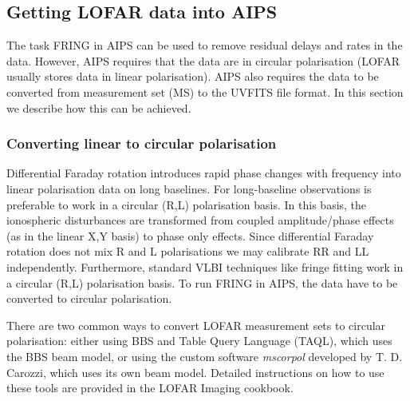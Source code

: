 \documentclass[graybox]{svmult}
\begin{document}


\subsection{Getting LOFAR data into AIPS}
The task FRING in AIPS can be used to remove residual delays and rates in the
data. However, AIPS requires that the data are in circular polarisation (LOFAR
usually stores data in linear polarisation). AIPS also requires the
data to be converted from measurement set (MS) to the UVFITS file format.
In this section we describe how this can be achieved. 

\subsubsection{Converting linear to circular polarisation}

Differential Faraday rotation introduces rapid phase changes with frequency
into linear polarisation data on long baselines. For long-baseline observations
is preferable to work in a circular (R,L) polarisation basis. In this basis,
the ionospheric disturbances are transformed from coupled amplitude/phase
effects (as in the linear X,Y basis) to phase only effects. Since differential
Faraday rotation does not mix R and L polarisations we may calibrate RR and LL
independently. Furthermore, standard VLBI techniques like fringe fitting work
in a circular (R,L) polarisation basis. To run FRING in AIPS, the data have to be
converted to circular polarisation.

There are two common ways to convert LOFAR measurement sets to circular polarisation:
either using BBS and Table Query Language (TAQL), which uses the BBS beam model,
or using the custom software \emph{mscorpol} developed by T. D. Carozzi, which uses
its own beam model. Detailed instructions on how to use these tools are provided in the LOFAR Imaging cookbook.
\end{document}
